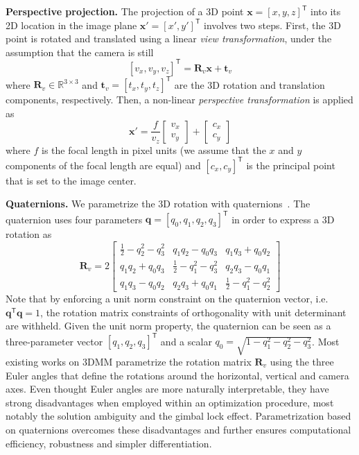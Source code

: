 %
\textbf{Perspective projection.} The projection of a 3D point
$\mathbf{x}={[x,y,z]}^\mathsf{T}$ into its 2D location in the image plane
$\mathbf{x}'={[x',y']}^\mathsf{T}$ involves two steps. First, the 3D point is
rotated and translated using a linear \emph{view transformation}, under the
assumption that the camera is still
%
\begin{equation}
{\left[v_x, v_y, v_z\right]}^\mathsf{T} = \mathbf{R}_v\mathbf{x} + \mathbf{t}_v
\label{equ:view_transform}
\end{equation}
%
where $\mathbf{R}_v\in\mathbb{R}^{3\times 3}$ and
$\mathbf{t}_v={[t_x,t_y,t_z]}^\mathsf{T}$ are the 3D rotation and translation
components, respectively. Then, a non-linear \emph{perspective transformation}
is applied as
%
\begin{equation}
\mathbf{x}' = \frac{f}{v_z}\left[\begin{array}{c}v_x\\v_y\end{array}\right] + \left[\begin{array}{c}c_x\\c_y\end{array}\right]
\label{equ:perspective_transform}
\end{equation}
%
where $f$ is the focal length in pixel units (we assume that the $x$ and $y$ components of the focal length are equal) and
${[c_x, c_y]}^\mathsf{T}$ is the principal point that is set to the image center.

%
\textbf{Quaternions.}
We parametrize the 3D rotation with quaternions~\cite{kuipers1999quaternions,wheeler1995iterative}.
The quaternion uses four parameters
$\mathbf{q}={\left[q_0,q_1,q_2,q_3\right]}^\mathsf{T}$ in order to express a 3D
rotation as
%
\begin{equation}
\mathbf{R}_v =
2\left[\begin{array}{ccc}
\frac{1}{2}-q_2^2-q_3^2 & q_1q_2-q_0q_3 & q_1q_3+q_0q_2\\
q_1q_2+q_0q_3 & \frac{1}{2}-q_1^2-q_3^2 & q_2q_3-q_0q_1\\
q_1q_3-q_0q_2 & q_2q_3+q_0q_1 & \frac{1}{2}-q_1^2-q_2^2
\end{array}\right]
\end{equation}
%
Note that by enforcing a unit norm constraint on the quaternion vector, i.e.
$\mathbf{q}^\mathsf{T}\mathbf{q}=1$, the rotation matrix constraints of
orthogonality with unit determinant are withheld. Given the unit norm property,
the quaternion can be seen as a three-parameter vector
${\left[q_1,q_2,q_3\right]}^\mathsf{T}$ and a scalar
$q_0=\sqrt{1-q_1^2-q_2^2-q_3^2}$. Most existing works on 3DMM parametrize the
rotation matrix $\mathbf{R}_v$ using the three Euler angles that define the
rotations around the horizontal, vertical and camera axes. Even thought Euler
angles are more naturally interpretable, they have strong disadvantages when
employed within an optimization procedure, most notably the solution ambiguity
and the gimbal lock effect. Parametrization based on quaternions overcomes these
disadvantages and further ensures computational efficiency, robustness and
simpler differentiation.

